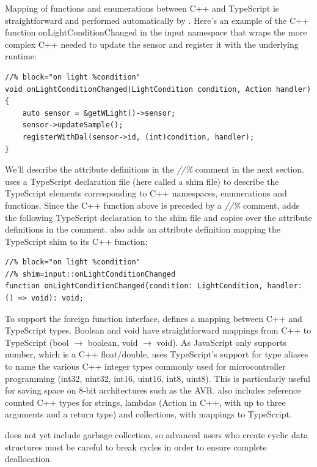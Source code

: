 Mapping of functions and enumerations between C++ and TypeScript is straightforward
and performed automatically by \MC. 
Here's an example of the C++ function onLightConditionChanged in the input namespace that 
wraps the more complex C++ needed to update the sensor and register it with the
underlying \CO runtime:
\begin{lstlisting}
//% block="on light %condition"
void onLightConditionChanged(LightCondition condition, Action handler) {
    auto sensor = &getWLight()->sensor;
    sensor->updateSample();
    registerWithDal(sensor->id, (int)condition, handler);
}
\end{lstlisting}

We'll describe the attribute definitions in the \emph{//\%} comment in the next section. 
\MC uses a TypeScript declaration file (here called a shim file) to describe the TypeScript elements corresponding
to C++ namespaces, enumerations and functions.
Since the C++ function above is preceded by a \emph{//\%} comment, 
\MC adds the following TypeScript declaration to the shim file and copies
over the attribute definitions in the comment. \MC also adds an attribute definition mapping
the TypeScript shim to its C++ function:

\begin{lstlisting}
//% block="on light %condition"
//% shim=input::onLightConditionChanged
function onLightConditionChanged(condition: LightCondition, handler: () => void): void;
\end{lstlisting}

To support the foreign function interface, \MC defines a mapping between C++ and TypeScript types.
Boolean and void have straightforward mappings from C++ to TypeScript (bool $\rightarrow$ boolean, void $\rightarrow$ void). 
As JavaScript only supports number, which is a C++ float/double, \MC uses TypeScript's support
for type aliases to name the various C++ integer types commonly used for microcontroller programming
(int32, uint32, int16, uint16, int8, uint8). 
This is particularly useful for saving space on 8-bit architectures such as the AVR. 
\MC also includes reference counted C++ types for strings, lambdas (Action in C++, with
up to three arguments and a return type) and collections, with mappings to TypeScript.

\MC does not yet include garbage collection, so advanced users who create cyclic
data structures must be careful to break cycles in order to ensure complete deallocation.

